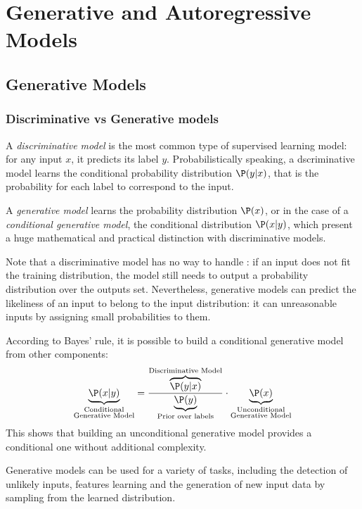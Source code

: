 \newpage

\section{Generative and Autoregressive Models}
\subsection{Generative Models}
\subsubsection{Discriminative vs Generative models}
A \emph{discriminative model} is the most common type of supervised learning model: for any input $x$, it predicts its label $y$. Probabilistically speaking, a dscriminative model learns the conditional probability distribution $\P(y|x)$, that is the probability for each label to correspond to the input. 

A \emph{generative model} learns the probability distribution $\P(x)$, or in the case of a \emph{conditional generative model}, the conditional distribution $\P(x|y)$, which present a huge mathematical and practical distinction with discriminative models.

Note that a discriminative model has no way to handle : if an input does not fit the training distribution, the model still needs to output a probability distribution over the outputs set. Nevertheless, generative models can predict the likeliness of an input to belong to the input distribution: it can  unreasonable inputs by assigning small probabilities to them.

According to Bayes' rule, it is possible to build a conditional generative model from other components:
\begin{equation*}
    \underbrace{\P(x|y)}_{\substack{\text{Conditional}\\ \text{Generative Model}}} = \frac{\overbrace{\P(y|x)}^{\text{Discriminative Model}}}{\underbrace{\P(y)}_{\text{Prior over labels}}}\cdot\underbrace{\P(x)}_{\substack{\text{Unconditional}\\ \text{Generative Model}}}
\end{equation*}
This shows that building an unconditional generative model provides a conditional one without additional complexity.

Generative models can be used for a variety of tasks, including the detection of unlikely inputs, features learning and the generation of new input data by sampling from the learned distribution.

